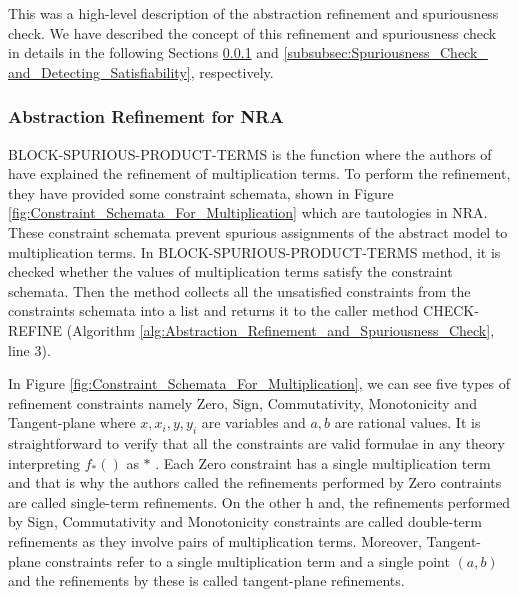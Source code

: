 \noindent This was a high-level description of the abstraction refinement and spuriousness check.
We have described the concept of this refinement and spuriousness check in details in the following Sections \ref{subsubsec:Abstraction_Refinement_for_NRA} and \ref{subsubsec:Spuriousness_Check_ and_Detecting_Satisfiability}, respectively.
\subsubsection{Abstraction Refinement for NRA}
\label{subsubsec:Abstraction_Refinement_for_NRA}
BLOCK-SPURIOUS-PRODUCT-TERMS is the function where the authors of \cite{Cimatti:2018:ILS:3274693.3230639} have explained the refinement of multiplication terms.
To perform the refinement, they have provided some constraint schemata, shown in Figure \ref{fig:Constraint_Schemata_For_Multiplication} which are tautologies in NRA.
These constraint schemata prevent spurious assignments of the abstract model to multiplication terms.
In BLOCK-SPURIOUS-PRODUCT-TERMS method, it is checked whether the values of multiplication terms satisfy the constraint schemata.
Then the method collects all the unsatisfied constraints from the constraints schemata into a list and returns it to the caller method CHECK-REFINE (Algorithm \ref{alg:Abstraction_Refinement_and_Spuriousness_Check}, line $3$).\newline

\noindent In Figure \ref{fig:Constraint_Schemata_For_Multiplication}, we can see five types of refinement constraints namely Zero, Sign, Commutativity,
Monotonicity and Tangent-plane where $x, x_{i},y, y_{i}$ are variables and $a, b$ are rational values.
It is straightforward to verify that all the constraints are valid formulae in any theory interpreting $f_{\ast}()$ as $\ast$ \cite{Cimatti:2018:ILS:3274693.3230639}.
Each Zero constraint has a single multiplication term and that is why the authors called the refinements performed by Zero contraints are called single-term refinements.
On the other h and, the refinements performed by Sign, Commutativity and Monotonicity constraints are called double-term refinements as they involve pairs of multiplication terms.
Moreover, Tangent-plane constraints refer to a single multiplication term and a single point $(a, b)$ and the refinements by these is called tangent-plane refinements.\newline

